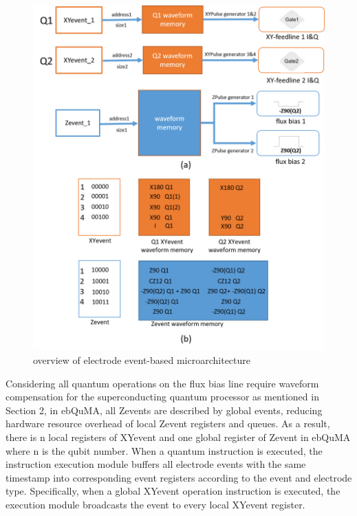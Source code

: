 \begin{figure}[h]
  \centering
  \includegraphics[width=\linewidth]{figure/4_6}
  \caption{overview of electrode event-based microarchitecture}
  \label{img6}
\end{figure}

Considering all quantum operations on the flux bias line require waveform compensation for the superconducting quantum processor as mentioned in Section 2, 
in ebQuMA, all Zevents are described by global events, reducing hardware resource overhead of local Zevent registers and queues. 
As a result, there is n local registers of XYevent and one global register of Zevent in ebQuMA where n is the qubit number. 
When a quantum instruction is executed, the instruction execution module buffers all electrode events with the same timestamp into corresponding event registers according to the event and electrode type. 
Specifically, when a global XYevent operation instruction is executed, the execution module broadcasts the event to every local XYevent register.



